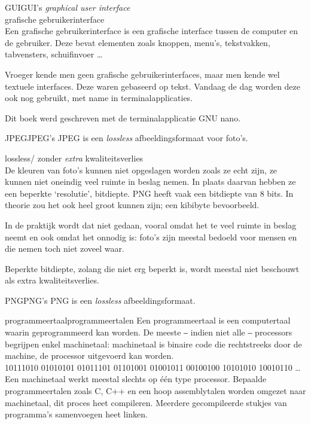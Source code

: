 \documentclass[11pt,a5paper,twoside]{book}
\begin{document}
  \begin{WOORD}{GUI}{GUI’s}
   \textit{graphical user interface}\\
    grafische gebruikerinterface\\
   Een grafische gebruikerinterface is een grafische interface tussen
    de computer en de gebruiker. Deze bevat elementen zoals knoppen,
    menu’s, tekstvakken, tabvensters, schuifinvoer  …

   Vroeger kende men geen grafische gebruikerinterfaces, maar men kende wel
    textuele interfaces. Deze waren gebaseerd op tekst. Vandaag de dag worden
    deze ook nog gebruikt, met name in terminalapplicaties.

   Dit boek werd geschreven met de terminalapplicatie GNU nano.
  \end{WOORD}
\HLI
  \begin{WOORD}{JPEG}{JPEG’s}
   JPEG is een \textit{lossless} afbeeldingsformaat voor foto’s.
  \end{WOORD}
  \begin{WOORD}{lossless}{/}
   zonder \textit{extra} kwaliteitsverlies\\
   De kleuren van foto’s kunnen niet opgeslagen worden zoals ze echt zijn,
    ze kunnen niet oneindig veel ruimte in beslag nemen. In plaats daarvan
    hebben ze een beperkte ‘resolutie’, bitdiepte. PNG heeft vaak een bitdiepte
    van 8 bits. In theorie zou het ook heel groot kunnen zijn; een kibibyte bevoorbeeld.

   In de praktijk wordt dat niet gedaan, vooral omdat het te veel ruimte in
    beslag neemt en ook omdat het onnodig is: foto’s zijn meestal bedoeld
    voor mensen en die nemen toch niet zoveel waar.

   Beperkte bitdiepte, zolang die niet erg beperkt is, wordt meestal niet
    beschouwt als extra kwaliteitsverlies.
  \end{WOORD}
\HLI
  \begin{WOORD}{PNG}{PNG’s}
   PNG is een \textit{lossless} afbeeldingsformaat.
  \end{WOORD}
  \begin{WOORD}{programmeertaal}{programmeertalen}
   Een programmeertaal is een computertaal waarin geprogrammeerd kan worden.
   De meeste ‒ indien niet alle ‒ processors begrijpen enkel machinetaal: machinetaal
    is binaire code die rechtstreeks door de machine, de processor uitgevoerd kan worden.\\
    10111010 01010101 01011101 01101001 01001011 00100100 10101010 10010110 … Een machinetaal
    werkt meestal slechts op één type processor. Bepaalde programmeertalen zoals C, C++ en
    een hoop assemblytalen worden omgezet naar machinetaal, dit proces heet compileren.
   Meerdere gecompileerde stukjes van programma’s samenvoegen heet linken.
  \end{WOORD}
\end{document}
